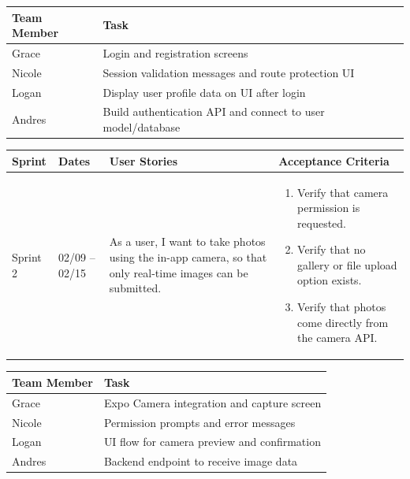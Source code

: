 \documentclass[12pt]{article}
\begin{document}
\vspace{0.5em}

\noindent
\begin{tabular}{|L{2.5cm}|L{12.5cm}|}
\hline
\textbf{Team Member} & \textbf{Task} \\
\hline
Grace & Login and registration screens \\
\hline
Nicole & Session validation messages and route protection UI \\
\hline
Logan & Display user profile data on UI after login \\
\hline
Andres & Build authentication API and connect to user model/database \\
\hline
\end{tabular}

\vspace{2em}


\vspace{0.5em}

\noindent
\begin{tabular}{|L{1.2cm}|L{1.8cm}|L{5.2cm}|L{6.3cm}|}
\hline
\textbf{Sprint} & \textbf{Dates} & \textbf{User Stories} & \textbf{Acceptance Criteria} \\
\hline
Sprint 2 & 02/09 -- 02/15 &
As a user, I want to take photos using the in-app camera, so that only real-time images can be submitted. &
\begin{enumerate}
    \item Verify that camera permission is requested.
    \item Verify that no gallery or file upload option exists.
    \item Verify that photos come directly from the camera API.
\end{enumerate} \\
\hline
\end{tabular}

\vspace{0.5em}

\noindent
\begin{tabular}{|L{2.5cm}|L{12.5cm}|}
\hline
\textbf{Team Member} & \textbf{Task} \\
\hline
Grace & Expo Camera integration and capture screen \\
\hline
Nicole & Permission prompts and error messages \\
\hline
Logan & UI flow for camera preview and confirmation \\
\hline
Andres & Backend endpoint to receive image data \\
\hline
\end{tabular}
\end{document}
